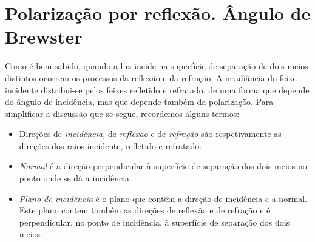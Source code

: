 \section{Polarização por reflexão. Ângulo de Brewster}
Como é bem sabido, quando a luz incide na superfície de separação de dois meios
distintos ocorrem os processos da reflexão e da refração. A irradiância do feixe
incidente distribui-se pelos feixes refletido e refratado, de uma forma que
depende do ângulo de incidência, mas que depende também da polarização. Para
simplificar a discussão que se segue, recordemos alguns termos:
\begin{itemize}[itemsep=-1pt,topsep=1pt,parsep=0pt,
                leftmargin=*,
]
\item Direções de \emph{incidência,} de \emph{reflexão} e de \emph{refração} são
respetivamente as direções dos raios incidente, refletido e refratado.
\item \emph{Normal} é a direção perpendicular à superfície de separação dos dois
meios no ponto onde se dá a incidência.
\item \emph{Plano de incidência} é o plano que contêm a direção de incidência e
a normal. Este plano contem também as direções de reflexão e de refração e é
perpendicular, no ponto de incidência, à superfície de separação dos dois meios.
\end{itemize}
